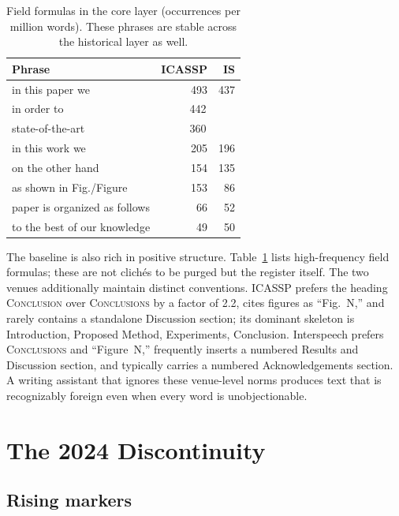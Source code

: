 \documentclass[a4paper,10pt,twocolumn]{article}
\begin{document}
\begin{table}[t]
  \caption{Field formulas in the core layer (occurrences per million words). These phrases are stable across the historical layer as well.}
  \label{tab:formulas}
  \centering
  \begin{tabular}{l r r}
    \hline
    \textbf{Phrase} & \textbf{ICASSP} & \textbf{IS} \\
    \hline
    in this paper we            & 493 & 437 \\
    in order to                 & \multicolumn{2}{c}{442} \\
    state-of-the-art            & \multicolumn{2}{c}{360} \\
    in this work we             & 205 & 196 \\
    on the other hand           & 154 & 135 \\
    as shown in Fig./Figure     & 153 & 86  \\
    paper is organized as follows & 66 & 52  \\
    to the best of our knowledge & 49  & 50  \\
    \hline
  \end{tabular}
\end{table}

The baseline is also rich in positive structure. Table~\ref{tab:formulas} lists high-frequency field formulas; these are not clich\'{e}s to be purged but the register itself. The two venues additionally maintain distinct conventions. ICASSP prefers the heading \textsc{Conclusion} over \textsc{Conclusions} by a factor of 2.2, cites figures as ``Fig.~N,'' and rarely contains a standalone Discussion section; its dominant skeleton is Introduction, Proposed Method, Experiments, Conclusion. Interspeech prefers \textsc{Conclusions} and ``Figure~N,'' frequently inserts a numbered Results and Discussion section, and typically carries a numbered Acknowledgements section. A writing assistant that ignores these venue-level norms produces text that is recognizably foreign even when every word is unobjectionable.

\section{The 2024 Discontinuity}

\subsection{Rising markers}
\end{document}
